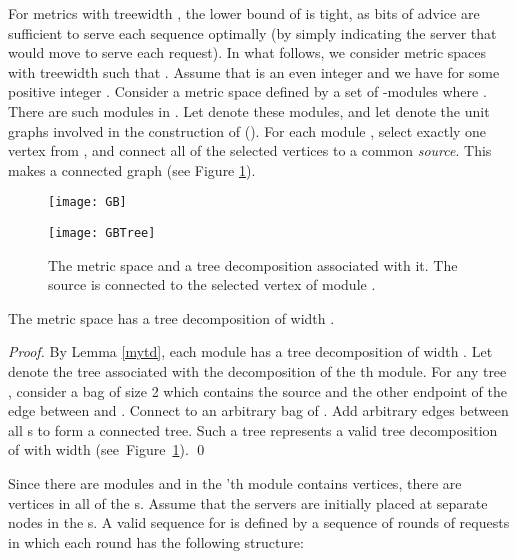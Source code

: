For metrics with treewidth , the lower bound of  is tight, as  bits of advice are sufficient to serve each sequence optimally (by simply indicating the server that \opt would move to serve each request). In what follows, we consider metric spaces with treewidth  such that . Assume that  is an even integer and we have  for some positive integer . 
Consider a metric space  defined by a set of -modules where . There are  such modules in . Let  denote these modules, and let  denote the unit graphs involved in the construction of  (). For each module , select exactly one vertex from , and connect all of the selected vertices to a common \textit{source}. This makes  a connected graph (see Figure \ref{fig:GB}).

\begin{figure}[t]
\begin{minipage}{0.5 \linewidth}
\centering
\texttt{[image: GB]}
\label{fig:figure1}
\end{minipage}
\begin{minipage}{0.5\linewidth}
\centering
\texttt{[image: GBTree]}
\label{fig:figure2}
\end{minipage}
\caption{The metric space  and a tree decomposition associated with it. The source  is connected to the selected vertex  of module . \label{fig:GB}}
\end{figure}

\begin{lemma} \label{lemunlab}
The metric space  has a tree decomposition of width .
\end{lemma}

\begin{proof}
By Lemma \ref{mytd}, each module has a tree decomposition of width . Let  denote the tree associated with the decomposition of the th module. For any tree , consider a bag  of 
size 2 which contains the source  and the other endpoint of the edge between  and . Connect  to an arbitrary bag of . Add  arbitrary edges between all s to form a connected tree. Such a tree represents a valid tree decomposition of  with width  \mbox{(see Figure \ref{fig:GB}).} \qed
\end{proof}


Since there are  modules and in the 'th module  contains  vertices, there are  vertices in all of the s. Assume that the  servers are initially placed at separate nodes in the s. A valid sequence for  is defined by a sequence of rounds of requests in which each round has the following structure: \\

